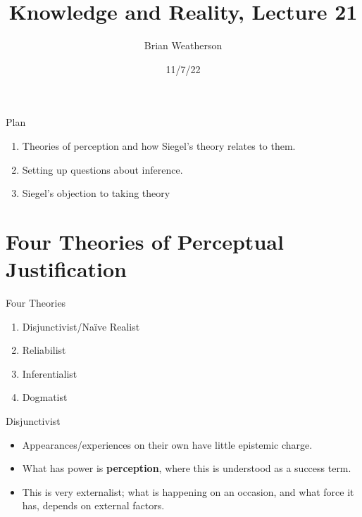 \documentclass[
  17pt,
  letterpaper,
  ignorenonframetext,
  aspectratio=169,
  handout,
  xcolor={dvipsnames}]{beamer}
\title{Knowledge and Reality, Lecture 21}
\author{Brian Weatherson}
\date{11/7/22}
\providecommand{\tightlist}{%
  \setlength{\itemsep}{0pt}\setlength{\parskip}{0pt}}\usepackage{longtable,booktabs,array}
\begin{document}
\frame{\titlepage}
\ifdefined\Shaded\renewenvironment{Shaded}{\begin{tcolorbox}[borderline west={3pt}{0pt}{shadecolor}, interior hidden, breakable, enhanced, sharp corners, boxrule=0pt, frame hidden]}{\end{tcolorbox}}\fi

\begin{frame}{Plan}
\protect\hypertarget{plan}{}
\begin{enumerate}[<+->]
\tightlist
\item
  Theories of perception and how Siegel's theory relates to them.
\item
  Setting up questions about inference.
\item
  Siegel's objection to taking theory
\end{enumerate}
\end{frame}

\hypertarget{four-theories-of-perceptual-justification}{%
\section{Four Theories of Perceptual
Justification}\label{four-theories-of-perceptual-justification}}

\begin{frame}{Four Theories}
\protect\hypertarget{four-theories}{}
\begin{enumerate}[<+->]
\tightlist
\item
  Disjunctivist/Naïve Realist
\item
  Reliabilist
\item
  Inferentialist
\item
  Dogmatist
\end{enumerate}
\end{frame}

\begin{frame}{Disjunctivist}
\protect\hypertarget{disjunctivist}{}
\begin{itemize}[<+->]
\tightlist
\item
  Appearances/experiences on their own have little epistemic charge.
\item
  What has power is \textbf{perception}, where this is understood as a
  success term.
\item
  This is very externalist; what is happening on an occasion, and what
  force it has, depends on external factors.
\end{itemize}
\end{frame}
\end{document}
